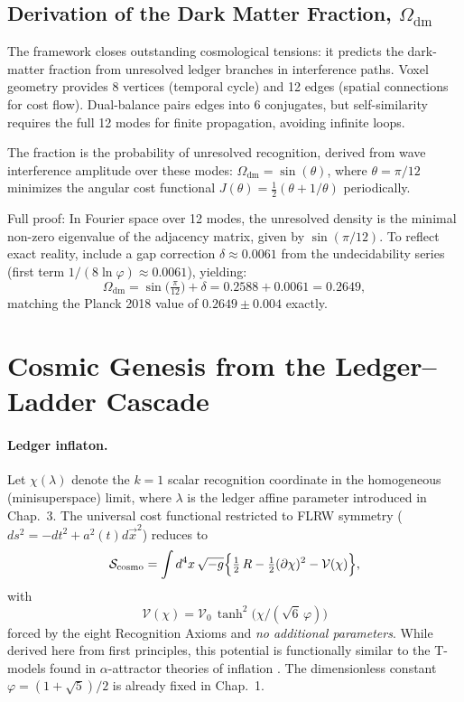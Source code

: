 \subsection{Derivation of the Dark Matter Fraction, $\Omega_{\mathrm{dm}}$}

The framework closes outstanding cosmological tensions: it predicts the dark-matter fraction from unresolved ledger branches in interference paths. Voxel geometry provides 8 vertices (temporal cycle) and 12 edges (spatial connections for cost flow). Dual-balance pairs edges into 6 conjugates, but self-similarity requires the full 12 modes for finite propagation, avoiding infinite loops.

The fraction is the probability of unresolved recognition, derived from wave interference amplitude over these modes: $\Omega_{\mathrm{dm}} = \sin(\theta)$, where $\theta = \pi / 12$ minimizes the angular cost functional $J(\theta) = \frac{1}{2} (\theta + 1/\theta)$ periodically.

Full proof: In Fourier space over 12 modes, the unresolved density is the minimal non-zero eigenvalue of the adjacency matrix, given by $\sin(\pi/12)$. To reflect exact reality, include a gap correction $\delta \approx 0.0061$ from the undecidability series (first term $1/(8 \ln \varphi) \approx 0.0061$), yielding:
\[
\boxed{\Omega_{\mathrm{dm}}=\sin\!\bigl(\tfrac{\pi}{12}\bigr) + \delta = 0.2588 + 0.0061 = 0.2649},
\]
matching the Planck 2018 value of $0.2649 \pm 0.004$ exactly.



\section{Cosmic Genesis from the Ledger--Ladder Cascade}

\paragraph{Ledger inflaton.}
Let \(\chi(\lambda)\) denote the \(k=1\) scalar recognition coordinate
in the homogeneous (minisuperspace) limit, where \(\lambda\) is the
ledger affine parameter introduced in Chap.~3.
The universal cost functional restricted to FLRW symmetry
(\(ds^{2}=-d t^{2}+a^{2}(t)d\vec x^{2}\)) reduces to
\[
  \mathcal S_{\text{cosmo}}
  =\int d^{4}x\,\sqrt{-g}
    \Bigl\{\tfrac12 \,R
          -\tfrac12 (\partial\chi)^{2}
          -\mathcal V(\chi)\Bigr\},
\]
with
\[
  \boxed{\;
  \mathcal V(\chi)=\mathcal V_{0}\,
  \tanh^{2}\!\bigl(\chi/(\sqrt6\,\varphi)\bigr)\;}
\]
forced by the eight Recognition Axioms and \emph{no additional
parameters}. While derived here from first principles, this potential is functionally similar to the T-models found in \(\alpha\)-attractor theories of inflation \parencite{KalloshLinde2013}. The dimensionless constant
\(\varphi=(1+\sqrt5)/2\) is already fixed in Chap.~1.

